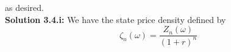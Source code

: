 \documentclass[12pt]{article}
\renewcommand{\P}{\mathbb P}
\newcommand{\E}{\mathbb E}
\begin{document}
as desired. \\

%
%
%
%
%

{\bf Solution 3.4.i:} We have the state price density defined by
\begin{equation*}
	\zeta_n(\omega) = \frac{ Z_n(\omega) }{ (1 + r)^n }
\end{equation*} 
\end{document}
